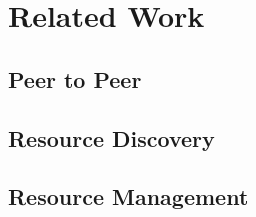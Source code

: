 \chapter{Related Work} \label{cha:related_work} 
\section{Peer to Peer} \label{sec:p2p} 
\section{Resource Discovery} \label{sec:res_discvovery} 
\section{Resource Management} \label{sec:res_management} 

